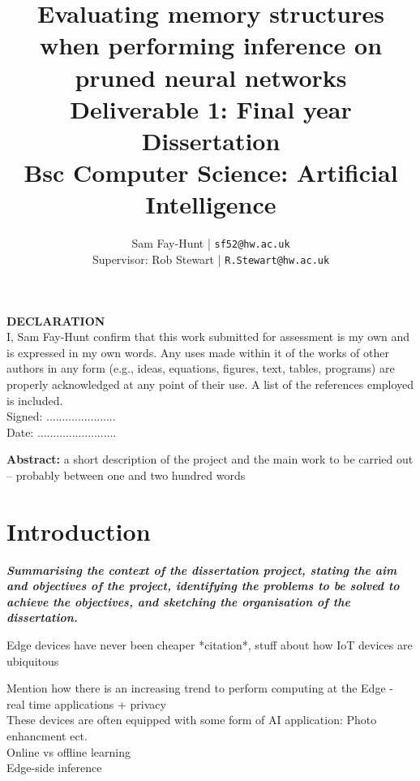 \documentclass[11pt]{article}
\begin{document}
\title{%
	\bf Evaluating memory structures when performing inference on pruned neural networks\\ 
	\large Deliverable 1: Final year Dissertation \\
	Bsc Computer Science: Artificial Intelligence}

\author{
	Sam Fay-Hunt | \texttt{sf52@hw.ac.uk}\\
	Supervisor: Rob Stewart | \texttt{R.Stewart@hw.ac.uk}
}

\maketitle

\pagebreak

\textbf{DECLARATION}\\
I, Sam Fay-Hunt confirm that this work submitted for assessment is my own and is expressed in
my own words. Any uses made within it of the works of other authors in any form (e.g., ideas,
equations, figures, text, tables, programs) are properly acknowledged at any point of their
use. A list of the references employed is included.\\
Signed: ......................\\
Date: .........................

\pagebreak

\textbf{Abstract:} a short description of the project and the main work to be carried out – probably
between one and two hundred words
\pagebreak

\tableofcontents
\thispagestyle{empty}
\pagebreak


\setcounter{page}{1}

\section{Introduction}
\emph{\textbf{Summarising the context of the dissertation project, stating the aim and objectives of the project, identifying the problems to be solved to achieve the objectives, and sketching
the organisation of the dissertation.}}

Edge devices have never been cheaper *citation*, stuff about how IoT devices are ubiquitous

Mention how there is an increasing trend to perform computing at the Edge - real time applications + privacy\\
These devices are often equipped with some form of AI application: Photo enhancment ect.\\
Online vs offline learning\\
Edge-side inference
\end{document}
